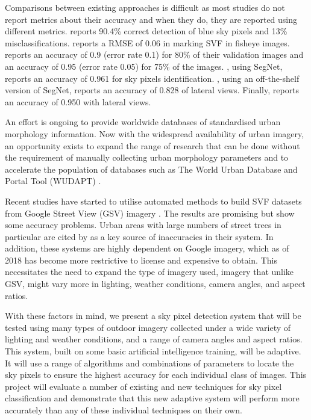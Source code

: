 \documentclass[final,3p,times,authoryear]{elsarticle}
\begin{document}

Comparisons between existing approaches is difficult as most studies do not report metrics about their accuracy and when they do, they are reported using different metrics. \cite{Luo2002} reports 90.4\% correct detection of blue sky pixels and 13\% misclassifications. \cite{Chapman2004} reports a RMSE of 0.06 in marking SVF in fisheye images. \cite{Schmitt2009} reports an accuracy of 0.9 (error rate 0.1) for 80\% of their validation images and an accuracy of 0.95 (error rate 0.05) for 75\% of the images. \cite{Liang2017}, using SegNet, reports an accuracy of 0.961 for sky pixels identification. \cite{Shen2018}, using an off-the-shelf version of SegNet, reports an accuracy of 0.828 of lateral views. Finally, \cite{Middel2019} reports an accuracy of 0.950 with lateral views.


An effort is ongoing to provide worldwide databases of standardised urban morphology information. Now with the widespread availability of urban imagery, an opportunity exists to expand the range of research that can be done without the requirement of manually collecting urban morphology parameters and to accelerate the population of databases such as The World Urban Database and Portal Tool (WUDAPT) \citep{Mills2015}.

Recent studies have started to utilise automated methods to build SVF datasets from Google Street View (GSV) imagery \citep{Middel2018,Gong2018}. The results are promising but show some accuracy problems. Urban areas with large numbers of street trees in particular are cited by \cite{Gong2018} as a key source of inaccuracies in their system. In addition, these systems are highly dependent on Google imagery, which as of 2018 has become more restrictive to license and expensive to obtain. This necessitates the need to expand the type of imagery used, imagery that unlike GSV, might vary more in lighting, weather conditions, camera angles, and aspect ratios. 

With these factors in mind, we present a sky pixel detection system that will  be tested using many types of outdoor imagery collected under a wide variety of lighting and weather conditions, and a range of camera angles and aspect ratios. This system, built on some basic artificial intelligence training, will be adaptive. It will use a range of algorithms and combinations of parameters to locate the sky pixels to ensure the highest accuracy for each individual class of images. This project will evaluate a number of existing and new techniques for sky pixel classification and demonstrate that this new adaptive system will perform more accurately than any of these individual techniques on their own.
\end{document}
